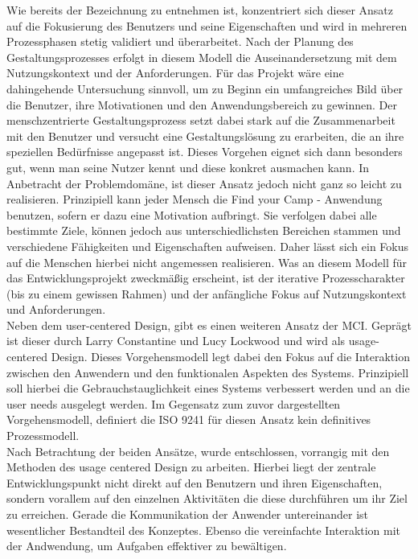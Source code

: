 Wie bereits der Bezeichnung zu entnehmen ist, konzentriert sich dieser Ansatz auf die Fokusierung des Benutzers und seine Eigenschaften und wird in mehreren Prozessphasen stetig validiert und überarbeitet. Nach der Planung des Gestaltungsprozesses erfolgt in diesem Modell die Auseinandersetzung mit dem Nutzungskontext und der Anforderungen. Für das Projekt wäre eine dahingehende Untersuchung sinnvoll, um zu Beginn ein umfangreiches Bild über die Benutzer, ihre Motivationen und den Anwendungsbereich zu gewinnen. 
Der menschzentrierte Gestaltungsprozess setzt dabei stark auf die Zusammenarbeit mit den Benutzer und versucht eine Gestaltungslösung zu erarbeiten, die an ihre speziellen Bedürfnisse angepasst ist. Dieses Vorgehen eignet sich dann besonders gut, wenn man seine Nutzer kennt und diese konkret ausmachen kann. In Anbetracht der Problemdomäne, ist dieser Ansatz jedoch nicht ganz so leicht zu realisieren. Prinzipiell kann jeder Mensch die Find your Camp - Anwendung benutzen, sofern er dazu eine Motivation aufbringt. Sie verfolgen dabei alle bestimmte Ziele, können jedoch aus unterschiedlichsten Bereichen stammen und verschiedene Fähigkeiten und Eigenschaften aufweisen. Daher lässt sich ein Fokus auf die Menschen hierbei nicht angemessen realisieren. Was an diesem Modell für das Entwicklungsprojekt zweckmäßig erscheint, ist der iterative Prozesscharakter (bis zu einem gewissen Rahmen) und der anfängliche Fokus auf Nutzungskontext und Anforderungen.\\
Neben dem user-centered Design, gibt es einen weiteren Ansatz der MCI. Geprägt ist dieser durch Larry Constantine und Lucy Lockwood und wird als usage-centered Design. Dieses Vorgehensmodell legt dabei den Fokus auf die Interaktion zwischen den Anwendern und den funktionalen Aspekten des Systems. Prinzipiell soll hierbei die Gebrauchstauglichkeit eines Systems verbessert werden und an die user needs ausgelegt werden. Im Gegensatz zum zuvor dargestellten Vorgehensmodell, definiert die ISO 9241 für diesen Ansatz kein definitives Prozessmodell.\\
Nach Betrachtung der beiden Ansätze, wurde entschlossen, vorrangig mit den Methoden des usage centered Design zu arbeiten. Hierbei liegt der zentrale Entwicklungspunkt nicht direkt auf den Benutzern und ihren Eigenschaften, sondern vorallem auf den einzelnen Aktivitäten die diese durchführen um ihr Ziel zu erreichen. Gerade die Kommunikation der Anwender untereinander ist wesentlicher Bestandteil des Konzeptes. Ebenso die vereinfachte Interaktion mit der Andwendung, um Aufgaben effektiver zu bewältigen.\\ 
